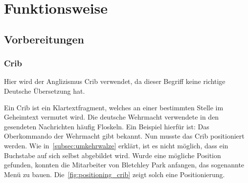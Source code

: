 \newpage

\section{Funktionsweise}\label{sec:funktionsweise_bombe}

\subsection{Vorbereitungen}\label{subsec:vorbereitungen}

\subsubsection{Crib}\label{subsubsec:crib}
Hier wird der Anglizismus \glqq Crib\grqq{} verwendet, da dieser Begriff keine richtige Deutsche Übersetzung hat.

Ein Crib ist ein Klartextfragment, welches an einer bestimmten Stelle im Geheimtext vermutet wird. 
Die deutsche Wehrmacht verwendete in den gesendeten Nachrichten häufig Floskeln. 
Ein Beispiel hierfür ist: \glqq Das Oberkommando der Wehrmacht gibt bekannt\grqq.
Nun musste das Crib positioniert werden.
Wie in~\cref{subsec:umkehrwalze} erklärt, ist es nicht möglich, dass ein Buchstabe auf sich selbst abgebildet wird.
Wurde eine mögliche Position gefunden, konnten die Mitarbeiter von Bletchley Park anfangen, das sogenannte Menü zu bauen.
Die~\cref{fig:positioning_crib} zeigt solch eine Positionierung.

